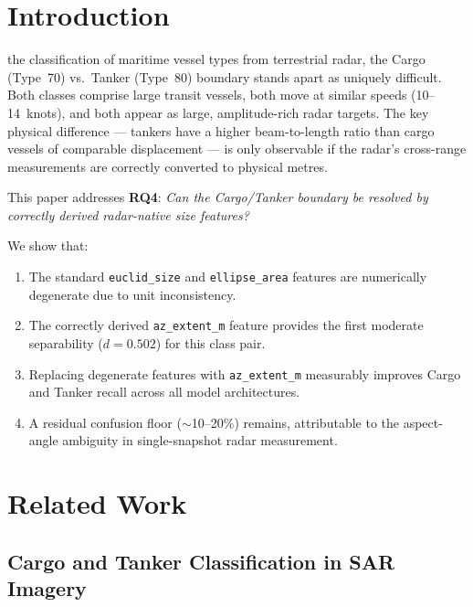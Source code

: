 \documentclass[journal]{IEEEtran}
\begin{document}
\maketitle
\IEEEdisplaynontitleabstractindextext
\IEEEpeerreviewmaketitle

\section{Introduction}

 the classification of maritime vessel types from
terrestrial radar, the Cargo (Type~70) vs.\ Tanker (Type~80) boundary stands
apart as uniquely difficult. Both classes comprise large transit vessels, both move at similar
speeds (10--14~knots), and both appear as large, amplitude-rich radar targets.
The key physical difference — tankers have a higher beam-to-length ratio than
cargo vessels of comparable displacement — is only observable if the radar's
cross-range measurements are correctly converted to physical metres.

This paper addresses \textbf{RQ4}: \textit{Can the Cargo/Tanker boundary be
resolved by correctly derived radar-native size features?}

We show that:
\begin{enumerate}
  \item The standard \texttt{euclid\_size} and \texttt{ellipse\_area} features
        are numerically degenerate due to unit inconsistency.
  \item The correctly derived \texttt{az\_extent\_m} feature provides the first
        moderate separability ($d = 0.502$) for this class pair.
  \item Replacing degenerate features with \texttt{az\_extent\_m} measurably
        improves Cargo and Tanker recall across all model architectures.
  \item A residual confusion floor ($\sim$10--20\%) remains, attributable to
        the aspect-angle ambiguity in single-snapshot radar measurement.
\end{enumerate}

\section{Related Work}
\label{sec:relatedwork}

\subsection{Cargo and Tanker Classification in SAR Imagery}
\end{document}
